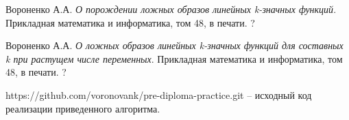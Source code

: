 \documentclass[oneside,final,14pt]{extreport}
\begin{document}
\begin{thebibliography}{0}

 Вороненко А.А. \emph{О порождении ложных образов линейных k-значных функций}. 
Прикладная математика и информатика, том 48, в печати. ?

 Вороненко А.А. \emph{О ложных образов линейных k-значных функций для составных k при растущем числе переменных}. 
Прикладная математика и информатика, том 48, в печати. ?

 https://github.com/voronovank/pre-diploma-practice.git -- исходный код реализации приведенного алгоритма.

\end{thebibliography}
\end{document}
